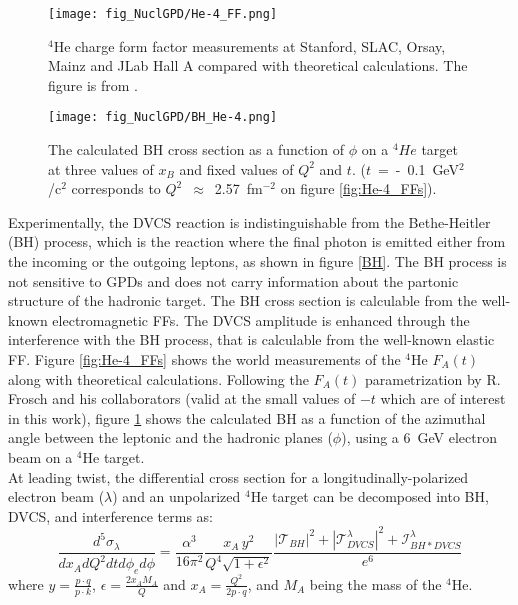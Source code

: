 \begin{figure}[tp]
\begin{minipage}[c]{.46\linewidth}
\hspace{-0.2in}\texttt{[image: fig\_NuclGPD/He-4\_FF.png]}
\caption{$^4$He charge form factor measurements at Stanford, SLAC, Orsay, Mainz 
and JLab Hall A compared with theoretical calculations. The figure is from 
\cite{PhysRevLett.112.132503}. }
\label{fig:He-4_FFs}
\end{minipage} \hfill
\begin{minipage}[c]{.46\linewidth}
\hspace{-0.3in}\texttt{[image: fig\_NuclGPD/BH\_He-4.png]}
\caption{The calculated BH cross section as a function of $\phi$ on a $^4He$ 
target at three values of $x_{B}$ and fixed values of $Q^{2}$ and $t$.  
($t$~=~-~0.1~GeV$^2$/c$^2$ corresponds to $Q^2$~$\approx$~2.57~fm$^{-2}$ on 
figure \ref{fig:He-4_FFs}).}
\vspace{+0.3in}
\label{fig:BH_cross_section_4He}
\end{minipage}
\end{figure}




Experimentally, the DVCS reaction is indistinguishable from the Bethe-Heitler 
(BH) process, which is the reaction where the final photon is emitted either 
from the incoming or the outgoing leptons, as shown in figure \ref{BH}. The BH 
process is not sensitive to GPDs and does not carry information about the 
partonic structure of the hadronic target. The BH cross section is calculable 
from the well-known electromagnetic FFs. The DVCS amplitude is enhanced through 
the interference with the BH process, that is calculable from the well-known 
elastic FF. Figure \ref{fig:He-4_FFs} shows the world measurements of the 
$^4$He $F_{A}(t)$ along with theoretical calculations. Following the $F_{A}(t)$ 
parametrization by R.  Frosch and his collaborators \cite{PhysRev.160.874} 
(valid at the small values of $-t$ which are of interest in this work), figure 
\ref{fig:BH_cross_section_4He} shows the calculated BH as a function of the 
azimuthal angle between the leptonic and the hadronic planes ($\phi$), using a 
6~GeV electron beam on a $^4$He target.\\

At leading twist, the differential cross section for a longitudinally-polarized 
electron beam ($\lambda$) and an unpolarized $^4$He target can be decomposed 
into BH, DVCS, and interference terms as:
\small
\begin{equation}
\frac{d^{5}\sigma_{\lambda}}{dx_{A} dQ^{2} dt d\phi_{e} d\phi} = 
\frac{\alpha^{3}}{16 \pi^{2}} \frac{x_{A} \, y^{2}}{Q^{4} \sqrt{1 + \epsilon ^{2}}} 
\frac{
|\mathcal{T}_{BH}|^{2} + |{\mathcal{T}}_{DVCS}^{\lambda}|^{2} + 
{\mathcal{I}}_{BH*DVCS}^{\lambda}}{e^{6}}
\label{eq:sigdiff}
\end{equation}
\normalsize
where $y = \frac{p \cdot q}{p \cdot k}$, $\epsilon  =  \frac{2 x_{A} M_{A}}{Q}$ 
and $x_A  =  \frac{Q^2}{2 p \cdot q}$, and $M_{A}$ being the mass of the 
$^4$He.

